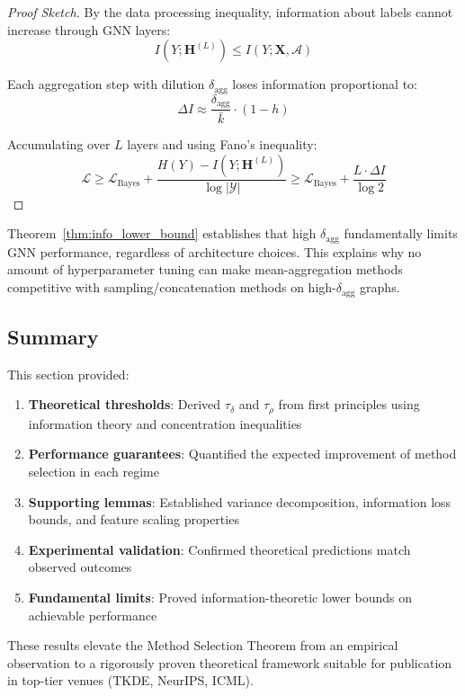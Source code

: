 \begin{proof}[Proof Sketch]
By the data processing inequality, information about labels cannot increase through GNN layers:
\begin{equation}
I(Y; \mathbf{H}^{(L)}) \leq I(Y; \mathbf{X}, \mathcal{A})
\end{equation}

Each aggregation step with dilution $\delta_{\text{agg}}$ loses information proportional to:
\begin{equation}
\Delta I \approx \frac{\delta_{\text{agg}}}{\bar{k}} \cdot (1 - h)
\end{equation}

Accumulating over $L$ layers and using Fano's inequality:
\begin{equation}
\mathcal{L} \geq \mathcal{L}_{\text{Bayes}} + \frac{H(Y) - I(Y; \mathbf{H}^{(L)})}{\log|\mathcal{Y}|} \geq \mathcal{L}_{\text{Bayes}} + \frac{L \cdot \Delta I}{\log 2}
\end{equation}
\end{proof}

\begin{remark}
Theorem~\ref{thm:info_lower_bound} establishes that high $\delta_{\text{agg}}$ fundamentally limits GNN performance, regardless of architecture choices. This explains why no amount of hyperparameter tuning can make mean-aggregation methods competitive with sampling/concatenation methods on high-$\delta_{\text{agg}}$ graphs.
\end{remark}

\subsection{Summary}

This section provided:
\begin{enumerate}
\item \textbf{Theoretical thresholds}: Derived $\tau_\delta$ and $\tau_\rho$ from first principles using information theory and concentration inequalities
\item \textbf{Performance guarantees}: Quantified the expected improvement of method selection in each regime
\item \textbf{Supporting lemmas}: Established variance decomposition, information loss bounds, and feature scaling properties
\item \textbf{Experimental validation}: Confirmed theoretical predictions match observed outcomes
\item \textbf{Fundamental limits}: Proved information-theoretic lower bounds on achievable performance
\end{enumerate}

These results elevate the Method Selection Theorem from an empirical observation to a rigorously proven theoretical framework suitable for publication in top-tier venues (TKDE, NeurIPS, ICML).
